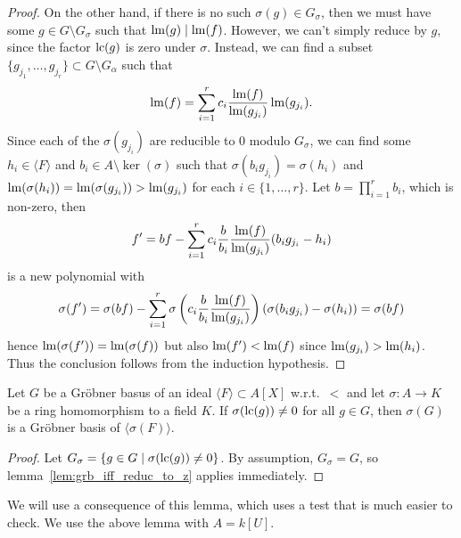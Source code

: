 \begin{proof}
  On the other hand, if there is no such $\sigma(g) \in G_{\sigma}$, then we must have some $g \in G \setminus G_{\sigma}$ such that $\operatorname{lm}(g) \mid \operatorname{lm}(f)$. However, we can't simply reduce by $g$, since the factor $\operatorname{lc}(g)$ is zero under $\sigma$. Instead, we can find a subset $\{g_{j_{1}}, \dots, g_{j_{r}}\} \subset G \setminus G_{\alpha}$ such that \[\operatorname{lm}(f) = \sum_{i = 1}^{r} c_{i} \frac{\operatorname{lm}(f)}{\operatorname{lm}(g_{j_{i}})} \operatorname{lm}(g_{j_{i}}).\]
  Since each of the $\sigma(g_{j_{i}})$ are reducible to 0 modulo $G_{\sigma}$, we can find some $h_{i} \in \langle F \rangle$ and $b_{i} \in A \setminus \ker(\sigma)$ such that $\sigma(b_{i} g_{j_{i}}) = \sigma(h_{i})$ and $\operatorname{lm}(\sigma(h_{i})) = \operatorname{lm}(\sigma(g_{j_{i}})) > \operatorname{lm}(g_{j_{i}})$ for each $i \in \{1, \dots, r\}$. Let $b = \prod_{i = 1}^{r} b_{i}$, which is non-zero, then
  \[f' = b f - \sum_{i = 1}^{r} c_{i} \frac{b}{b_{i}} \frac{\operatorname{lm}(f)}{\operatorname{lm}(g_{j_{i}})}(b_{i}g_{j_{i}} - h_{i})\]
  is a new polynomial with
  \[\sigma(f') = \sigma(b f) - \sum_{i = 1}^{r} \sigma\left(c_{i} \frac{b}{b_{i}} \frac{\operatorname{lm}(f)}{\operatorname{lm}(g_{j_{i}})}\right) (\sigma(b_{i} g_{j_{i}}) - \sigma(h_{i})) = \sigma(b f)\]
  hence $\operatorname{lm}(\sigma(f')) = \operatorname{lm}(\sigma(f))$ but also $\operatorname{lm}(f') < \operatorname{lm}(f)$ since $\operatorname{lm}(g_{j_{i}}) > \operatorname{lm}(h_{i})$. Thus the conclusion follows from the induction hypothesis.
\end{proof}

\begin{corollary}\label{cor:grb_if_nmap_to_z}
  Let $G$ be a Gröbner basus of an ideal $\langle F \rangle \subset A[X]$ w.r.t.\ $<$ and let $\sigma : A \to K$ be a ring homomorphism to a field $K$. If $\sigma(\operatorname{lc}(g)) \neq 0$ for all $g \in G$, then $\sigma(G)$ is a Gröbner basis of $\langle \sigma(F) \rangle$.
\end{corollary}
\begin{proof}
  Let $G_{\sigma} = \{g \in G \mid \sigma(\operatorname{lc}(g)) \neq 0\}$. By assumption, $G_{\sigma} = G$, so lemma~\ref{lem:grb_iff_reduc_to_z} applies immediately.
\end{proof}


We will use a consequence of this lemma, which uses a test that is much easier to check. We use the above lemma with $A = k[U]$.

